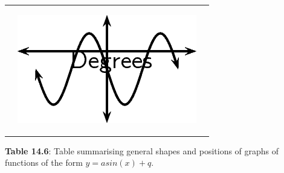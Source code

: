 \begin{center}
\begin{xtabular*}{\mytablewidth}[t]{|p{10\mystarwidth}|p{10\mystarwidth}|p{10\mystarwidth}|}
\begin{center}
    \end{center}    
                 &
    \setcounter{subfigure}{0}
\label{m39414*id85433}
    \begin{center}
    \label{m39414*id85433!!!underscore!!!media}\label{m39414*id85433!!!underscore!!!printimage}\includegraphics{col11306.imgs/m39414_MG10C15_022.png} %
      \vspace{2pt}
    \vspace{.1in}
    \end{center}    
     \tabularnewline{}
    \end{xtabular*}
      \end{center}
    \begin{center}{\small\bfseries Table 14.6}: Table summarising general shapes and positions of graphs of functions of the form $y=asin\left(x\right)+q$.\end{center}
    \par
        \label{m39414*uid47}
